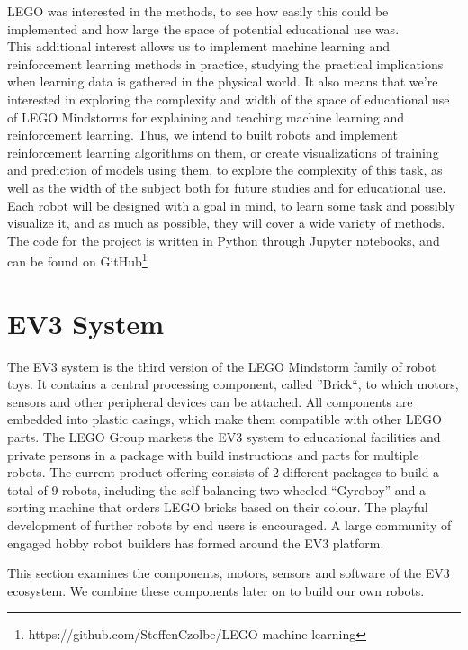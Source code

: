 \documentclass[11pt, a4paper]{article}
\begin{document}
LEGO was interested in the methods, to see how easily this could be implemented and how large the space of potential educational use was. \\
This additional interest allows us to implement machine learning and reinforcement learning methods in practice, studying the practical implications when learning data is gathered in the physical world. It also means that we're interested in exploring the complexity and width of the space of educational use of LEGO Mindstorms for explaining and teaching machine learning and reinforcement learning. Thus, we intend to built robots and implement reinforcement learning algorithms on them, or create visualizations of training and prediction of models using them, to explore the complexity of this task, as well as the width of the subject both for future studies and for educational use. Each robot will be designed with a goal in mind, to learn some task and possibly visualize it, and as much as possible, they will cover a wide variety of methods. The code for the project is written in Python through Jupyter notebooks, and can be found on GitHub\footnote{https://github.com/SteffenCzolbe/LEGO-machine-learning}

\section{EV3 System}
The EV3 system is the third version of the LEGO Mindstorm family of robot toys. It contains a central processing component, called ''Brick``, to which motors, sensors and other peripheral devices can be attached. All components are embedded into plastic casings, which make them compatible with other LEGO parts. The LEGO Group markets the EV3 system to educational facilities and private persons in a package with build instructions and parts for multiple robots. The current product offering consists of 2 different packages to build a total of 9 robots, including the self-balancing two wheeled ``Gyroboy'' and a sorting machine that orders LEGO bricks based on their colour. The playful development of further robots by end users is encouraged. A large community of engaged hobby robot builders has formed around the EV3 platform.

This section examines the components, motors, sensors and software of the EV3 ecosystem. We combine these components later on to build our own robots.
\end{document}
